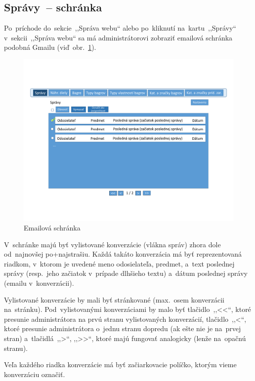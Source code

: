 \subsection{Správy~-- schránka}

Po~príchode do~sekcie~,,Správa webu`` alebo po~kliknutí na~kartu~,,Správy`` v~sekcii~,,Správa webu`` sa má administrátorovi zobraziť emailová schránka podobná Gmailu (viď~obr.~\ref{messages}).

\begin{figure}[H]\centering
\includegraphics[width=140mm]{../img/UI concept/messages}
\caption{Emailová schránka}
\label{messages}
\end{figure}

V~schránke majú byť vylistované konverzácie (vlákna správ) zhora dole od~najnovšej po+najstrašiu. Každá takáto konverzácia má byť reprezentovaná riadkom, v~ktorom je uvedené meno odosielateľa, predmet, a~text poslednej správy (resp.~jeho začiatok v~prípade dlhšieho textu) a~dátum poslednej správy (emailu v~konverzácii).

Vylistované konverzácie by mali byť stránkované (max.~osem konverzácii na~stránku). Pod~vylistovanými konverzáciami by malo byť tlačidlo~,,<<``, ktoré presunie administrátora na prvú stranu vylistovaných konverzácií, tlačidlo~,,<``, ktoré presunie administrátora o~jednu stranu dopredu (ak ešte nie je na~prvej stran) a~tlačidlá~,,>``, ,,>>``, ktoré majú fungovať analogicky (lenže na~opačnú stranu).

Veľa každého riadka konverzácie má byť začiarkovacie políčko, ktorým vieme konverzáciu označiť.


